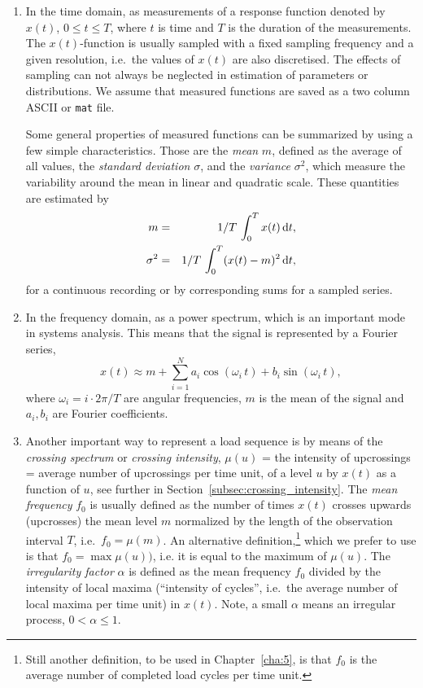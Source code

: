 \begin{enumerate}
\item In the time domain, as measurements of a response function
denoted by $x(t)$, $0\le t\le T$, where $t$ is time and $T$ is the
duration of the measurements. The  $x(t)$-function is usually
sampled with a fixed sampling frequency and a given resolution,
i.e.\ the values of $x(t)$ are also discretised. The effects of
sampling can not always be neglected in estimation of parameters
or distributions. We assume that measured functions are saved as a
two column ASCII or {\tt mat} file.

Some general properties of measured functions can be
summarized by using a few simple characteristics. Those are the
\emph{mean} $m$, defined as the average of all values, the
\emph{standard deviation} $\sigma$, and the \emph{variance}
$\sigma^2$, which measure the variability around the mean in linear
and quadratic scale. These quantities are estimated by
\begin{eqnarray}
m &=&1/T\,\int_0^T x(t)\, \mathrm{d} t, \\
\sigma^2 &=& 1/T\,\int_0^T (x(t)-m)^2\, \mathrm{d} t,
\end{eqnarray}
for a continuous recording or by corresponding sums for a sampled series.

\item In the frequency domain, as a power spectrum, which is an
important mode in systems analysis. This means that the signal
is represented by a Fourier series,
\begin{equation}
x(t)\approx
m + \sum_{i=1}^N a_i\cos(\omega_i\,t)+b_i
\sin(\omega_i\,t),
\label{eqn:fourier_series}
\end{equation}
where $\omega_i=i\cdot 2\pi/T$ are angular
frequencies,
$m$ is the mean of the signal and $a_i,b_i$ are Fourier coefficients.

\item Another important way to represent a load sequence is by means of
the \emph{crossing spectrum}
 or
\emph{ crossing intensity},
$\mu(u)$ = the intensity of
upcrossings = average number of upcrossings per time unit, of a
level $u$ by $x(t)$ as a function of $u$,
see further in Section~\ref{subsec:crossing_intensity}.
The \emph{mean frequency}
$f_0$ is usually defined as the number of
times $x(t)$ crosses upwards (upcrosses) the mean level  $m$
normalized by the length of the observation interval $T$, i.e.\
$f_0=\mu(m)$. An alternative definition,\footnote{Still another
  definition, to be used in Chapter~\ref{cha:5},
is that $f_0$ is the average number of completed load cycles per time
unit.} which we prefer to use is that $f_0=\max \mu(u))$, i.e.
it is equal to the maximum of $\mu(u)$.
The \emph{irregularity factor}
$\alpha$ is defined as the mean frequency $f_0$
divided by the intensity of local maxima (``intensity of cycles'', i.e.\
the average number of local maxima per time unit)
in $x(t)$. Note, a small $\alpha$ means an irregular process,
$0 < \alpha \leq 1$.
\end{enumerate}

